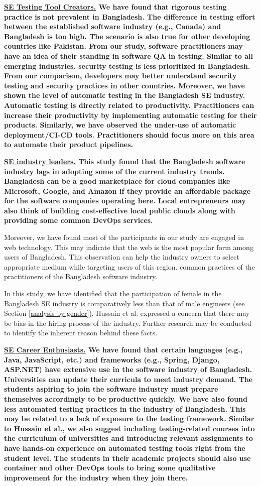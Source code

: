 \bf{\ul{SE Testing Tool Creators.}} We have found that rigorous testing practice
is not prevalent in Bangladesh. The difference in testing effort between the
established software industry (e.g., Canada) and Bangladesh is too high. The
scenario is also true for other developing countries like Pakistan. From our
study, software practitioners may have an idea of their standing in software QA
in testing. Similar to all emerging industries, security testing is less
prioritized in Bangladesh. From our comparison, developers may better understand
security testing and security practices in other countries. Moreover, we have
shown the level of automatic testing in the Bangladesh SE industry. Automatic
testing is directly related to productivity. Practitioners can increase their
productivity by implementing automatic testing for their products. Similarly, we
have observed the under-use of automatic deployment/CI-CD tools. Practitioners
should focus more on this area to automate their product pipelines.
 

\bf{\ul{SE industry leaders.}} This study found that the Bangladesh software
industry lags in adopting some of the current industry trends. Bangladesh can be
a good marketplace for cloud companies like Microsoft, Google, and Amazon if
they provide an affordable package for the software companies operating here.
Local entrepreneurs may also think of building cost-effective local public
clouds along with providing some common DevOps services.

Moreover, we have found most of the participants in our study are engaged in web
technology. This may indicate that the web is the most popular form among users
of Bangladesh. This observation can help the industry owners to select
appropriate medium while targeting users of this region. %
common practices of the practitioners of the Bangladesh software industry.

In this study, we have identified that the
participation of female in the Bangladesh SE industry is comparatively less than
that of male engineers (see Section \ref{analysis by gender}). Hussain et al.\citep{Hussain2020} expressed a
concern that there may be bias in the hiring process of the industry. Further
research may be conducted to identify the inherent reason behind these facts.

\bf{\ul{SE Career Enthusiasts.}} We have found that certain languages (e.g.,
Java, JavaScript, etc.) and frameworks (e.g., Spring, Django, ASP.NET) have
extensive use in the software industry of Bangladesh. Universities can update
their curricula to meet industry demand. The students aspiring to join the
software industry must prepare themselves accordingly to be productive quickly.
We have also found less automated testing practices in the industry of
Bangladesh. This may be related to a lack of exposure to the testing framework.
Similar to Hussain et al.\citep{Hussain2020}, we also suggest including
testing-related courses into the curriculum of universities and introducing
relevant assignments to have hands-on experience on automated testing tools
right from the student level. The students in their academic projects should
also use container and other DevOps tools to bring some qualitative improvement
for the industry when they join there.

